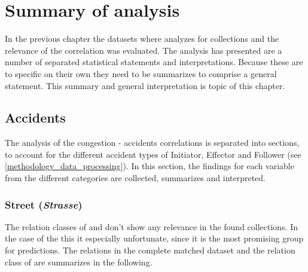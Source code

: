 \chapter{Summary of analysis}
\label{analysis_summary}
In the previous chapter the datasets where analyzes for collections and the relevance of the correlation was evaluated. The analysis has presented are a number of separated statistical statements and interpretations. Because these are to specific on their own they need to be summarizes to comprise a general statement. This summary and general interpretation is topic of this chapter.

\section{Accidents}
The analysis of the congestion -  accidents correlations is separated into sections, to account for the different accident types of Initiator, Effector and Follower (see \cref{methodology_data_processing}). In this section, the findings for each variable from the different categories are collected, summarizes and interpreted. 

\subsection{Street (\textit{Strasse})}
\label{analysis_sum_Strasse}
The relation classes of  and  don't show any relevance in the found collections. In the case of the  this it especially unfortunate, since it is the most promising group for predictions. The relations in the complete matched dataset and the relation class of  are summarizes in the following.

